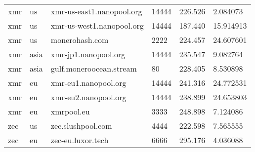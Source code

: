 \begin{table}
\begin{tabular}{|l|l|l|l|l|l|}
        xmr  & us     & xmr-us-east1.nanopool.org & 14444 & 226.526       & 2.084073     \\
        xmr  & us     & xmr-us-west1.nanopool.org & 14444 & 187.440       & 15.914913    \\
        xmr  & us     & monerohash.com            & 2222  & 224.457       & 24.607601    \\
        xmr  & asia   & xmr-jp1.nanopool.org      & 14444 & 235.547       & 9.082764     \\
        xmr  & asia   & gulf.moneroocean.stream   & 80    & 228.405       & 8.530898     \\
        xmr  & eu     & xmr-eu1.nanopool.org      & 14444 & 241.316       & 24.772531    \\
        xmr  & eu     & xmr-eu2.nanopool.org      & 14444 & 238.899       & 24.653803    \\
        xmr  & eu     & xmrpool.eu                & 3333  & 248.898       & 7.124086     \\
        zec  & us     & zec.slushpool.com         & 4444  & 222.598       & 7.565555     \\
        zec  & eu     & zec-eu.luxor.tech         & 6666  & 295.176       & 4.036088     \\
        \hline
    \end{tabular}
\end{table}